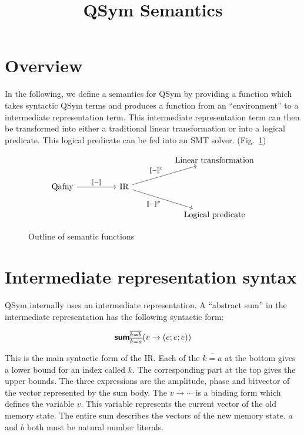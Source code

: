 \documentclass[runningheads]{llncs}
\newcommand {\ir} [1] {\textsf{\textbf{#1}}}
\newcommand {\irSum} {\ir{sum}}
\begin{document}
\title{QSym Semantics}
\author{}
\institute{}
\maketitle

\section{Overview}

In the following, we define a semantics for QSym by providing a function which takes syntactic QSym terms and produces a function from an ``environment'' to a intermediate representation term. This intermediate representation term can then be transformed into either a traditional linear transformation or into a logical predicate. This logical predicate can be fed into an SMT solver. (Fig.~\ref{fig:sem-fns})

\begin{figure}
  \[\begin{tikzcd}
          &&&& {\textnormal{Linear transformation}} \\
          {\textnormal{Qafny}} && {\textnormal{IR}} \\
          &&&& {\textnormal{Logical predicate}}
          \arrow["{\llbracket-\rrbracket}", from=2-1, to=2-3]
          \arrow["{\llbracket-\rrbracket^t}", from=2-3, to=1-5]
          \arrow["{\llbracket-\rrbracket^p}"', from=2-3, to=3-5]
  \end{tikzcd}\]
  \caption{Outline of semantic functions}
  \label{fig:sem-fns}
\end{figure}


\section{Intermediate representation syntax}

QSym internally uses an intermediate representation. A ``abstract sum'' in the intermediate representation has the following syntactic form:

\[
  \irSum_{\overline{k=a}}^{\overline{k=b}}(v \rightarrow (e; e; e))
\]

This is the main syntactic form of the IR. Each of the $\overline{k=a}$ at the bottom gives a lower bound for an index called $k$. The corresponding part at the top gives the upper bounds.
The three expressions are the amplitude, phase and bitvector of the vector represented by the sum body. The $v \rightarrow \cdots$ is a binding form which defines the variable $v$. This variable represents the current vector of the old memory state. The entire sum describes the vectors of the new memory state. $a$ and $b$ both must be natural number literals.
\end{document}
